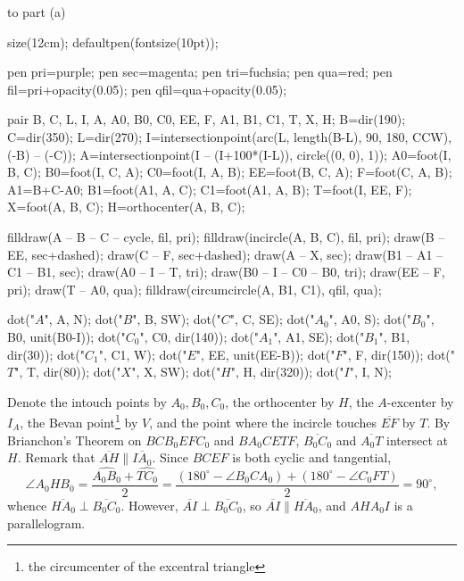 \begin{customsol}{to part (a)}\
    \begin{center}
        \begin{asy}
            size(12cm);
            defaultpen(fontsize(10pt));

            pen pri=purple;
            pen sec=magenta;
            pen tri=fuchsia;
            pen qua=red;
            pen fil=pri+opacity(0.05);
            pen qfil=qua+opacity(0.05);

            pair B, C, L, I, A, A0, B0, C0, EE, F, A1, B1, C1, T, X, H;
            B=dir(190); C=dir(350); L=dir(270);
            I=intersectionpoint(arc(L, length(B-L), 90, 180, CCW), (-B) -- (-C));
            A=intersectionpoint(I -- (I+100*(I-L)), circle((0, 0), 1));
            A0=foot(I, B, C);
            B0=foot(I, C, A);
            C0=foot(I, A, B);
            EE=foot(B, C, A);
            F=foot(C, A, B);
            A1=B+C-A0;
            B1=foot(A1, A, C);
            C1=foot(A1, A, B);
            T=foot(I, EE, F);
            X=foot(A, B, C);
            H=orthocenter(A, B, C);

            filldraw(A -- B -- C -- cycle, fil, pri);
            filldraw(incircle(A, B, C), fil, pri);
            draw(B -- EE, sec+dashed); draw(C -- F, sec+dashed);
            draw(A -- X, sec);
            draw(B1 -- A1 -- C1 -- B1, sec);
            draw(A0 -- I -- T, tri); draw(B0 -- I -- C0 -- B0, tri);
            draw(EE -- F, pri);
            draw(T -- A0, qua);
            filldraw(circumcircle(A, B1, C1), qfil, qua);

            dot("$A$", A, N);
            dot("$B$", B, SW);
            dot("$C$", C, SE);
            dot("$A_0$", A0, S);
            dot("$B_0$", B0, unit(B0-I));
            dot("$C_0$", C0, dir(140));
            dot("$A_1$", A1, SE);
            dot("$B_1$", B1, dir(30));
            dot("$C_1$", C1, W);
            dot("$E$", EE, unit(EE-B));
            dot("$F$", F, dir(150));
            dot("$T$", T, dir(80));
            dot("$X$", X, SW);
            dot("$H$", H, dir(320));
            dot("$I$", I, N);
        \end{asy}
    \end{center}
    Denote the intouch points by $A_0,B_0,C_0$, the orthocenter by $H$, the $A$-excenter by $I_A$, the Bevan point\footnote{the circumcenter of the excentral triangle} by $V$, and the point where the incircle touches $\overline{EF}$ by $T$. By Brianchon's Theorem on $BCB_0EFC_0$ and $BA_0CETF$, $\overline{B_0C_0}$ and $\overline{A_0T}$ intersect at $H$. Remark that $\overline{AH}\parallel\overline{IA_0}$. Since $BCEF$ is both cyclic and tangential, \[\angle A_0HB_0=\frac{\widehat{A_0B_0}+\widehat{TC_0}}2=\frac{(180^\circ-\angle B_0CA_0)+(180^\circ-\angle C_0FT)}2=90^\circ,\]
    whence $\overline{HA_0}\perp\overline{B_0C_0}$. However, $\overline{AI}\perp\overline{B_0C_0}$, so $\overline{AI}\parallel\overline{HA_0}$, and $AHA_0I$ is a parallelogram.


\end{customsol}
